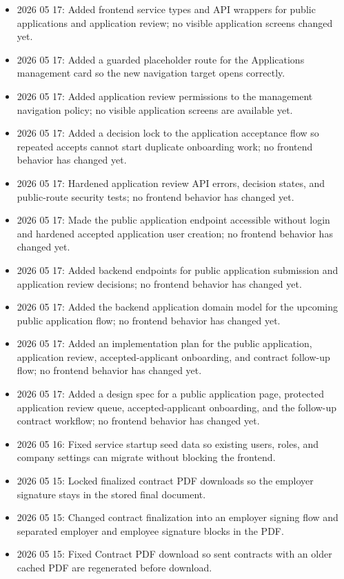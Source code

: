 \documentclass[11pt]{article}
\begin{document}
\begin{itemize}
    \item 2026 05 17: Added frontend service types and API wrappers for public applications and application review; no visible application screens changed yet.
    \item 2026 05 17: Added a guarded placeholder route for the Applications management card so the new navigation target opens correctly.
    \item 2026 05 17: Added application review permissions to the management navigation policy; no visible application screens are available yet.
    \item 2026 05 17: Added a decision lock to the application acceptance flow so repeated accepts cannot start duplicate onboarding work; no frontend behavior has changed yet.
    \item 2026 05 17: Hardened application review API errors, decision states, and public-route security tests; no frontend behavior has changed yet.
    \item 2026 05 17: Made the public application endpoint accessible without login and hardened accepted application user creation; no frontend behavior has changed yet.
    \item 2026 05 17: Added backend endpoints for public application submission and application review decisions; no frontend behavior has changed yet.
    \item 2026 05 17: Added the backend application domain model for the upcoming public application flow; no frontend behavior has changed yet.
    \item 2026 05 17: Added an implementation plan for the public application, application review, accepted-applicant onboarding, and contract follow-up flow; no frontend behavior has changed yet.
    \item 2026 05 17: Added a design spec for a public application page, protected application review queue, accepted-applicant onboarding, and the follow-up contract workflow; no frontend behavior has changed yet.
    \item 2026 05 16: Fixed service startup seed data so existing users, roles, and company settings can migrate without blocking the frontend.
    \item 2026 05 15: Locked finalized contract PDF downloads so the employer signature stays in the stored final document.
    \item 2026 05 15: Changed contract finalization into an employer signing flow and separated employer and employee signature blocks in the PDF.
    \item 2026 05 15: Fixed Contract PDF download so sent contracts with an older cached PDF are regenerated before download.

\end{itemize}
\end{document}
